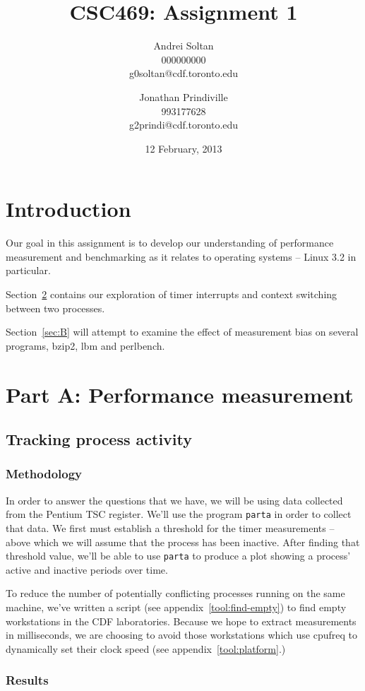 \documentclass{article}
\author{Andrei Soltan\\000000000\\g0soltan@cdf.toronto.edu
\and Jonathan Prindiville\\993177628\\g2prindi@cdf.toronto.edu}
\title{CSC469: Assignment 1}
\date{12 February, 2013}
\begin{document}
\maketitle

\tableofcontents

\newpage
\section{Introduction}
Our goal in this assignment is to develop our understanding of performance
measurement and benchmarking as it relates to operating systems -- Linux 3.2
in particular.

Section~\ref{sec:A} contains our exploration of timer interrupts and context
switching between two processes.

Section~\ref{sec:B} will attempt to examine the effect of measurement bias
on several programs, bzip2, lbm and perlbench.

\section{Part A: Performance measurement}
\label{sec:A}
\subsection{Tracking process activity}

\subsubsection{Methodology}
In order to answer the questions that we have, we will be using data collected
from the Pentium TSC register. We'll use the program \lstinline{parta} in order
to collect that data. We first must establish a threshold for the timer
measurements -- above which we will assume that the process has been inactive.
After finding that threshold value, we'll be able to use \lstinline{parta} to
produce a plot showing a process' active and inactive periods over time.

To reduce the number of potentially conflicting processes running on the same
machine, we've written a script (see appendix~\ref{tool:find-empty})
to find empty workstations in the CDF laboratories. Because we hope to extract
measurements in milliseconds, we are choosing to avoid those workstations which
use cpufreq to dynamically set their clock speed (see appendix~\ref{tool:platform}.)

\subsubsection{Results}
\end{document}
